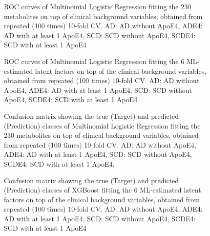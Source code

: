 \documentclass{amsart}
\begin{document}
\begin{figure}[h]
  
  \caption{\label{roc:full}ROC curves of Multinomial Logistic Regression fitting the 230 metabolites on top of clinical background variables, obtained from repeated (100 times) 10-fold CV. AD: AD without ApoE4, ADE4: AD with at least 1 ApoE4, SCD: SCD without ApoE4, SCDE4: SCD with at least 1 ApoE4}
  
\end{figure} \clearpage
\begin{figure}[ht]

\caption{\label{roc:6mlogit} ROC curves of Multinomial Logistic Regression fitting the 6 ML-estimated latent factors on top of the clinical background variables, obtained from repeated (100 times) 10-fold CV. AD: AD without ApoE4, ADE4: AD with at least 1 ApoE4, SCD: SCD without ApoE4, SCDE4: SCD with at least 1 ApoE4}
\end{figure} 
\begin{figure}[h]
  
  \caption{Confusion matrix showing the true (Target) and predicted (Prediction) classes of Multinomial Logistic Regression fitting the 230 metabolites on top of clinical background variables, obtained from repeated (100 times) 10-fold CV. AD: AD without ApoE4, ADE4: AD with at least 1 ApoE4, SCD: SCD without ApoE4, SCDE4: SCD with at least 1 ApoE4.}
  \label{cm:full}
\end{figure}
\begin{figure}[ht]
    
    \caption{Confusion matrix showing the true (Target) and predicted (Prediction) classes of XGBoost fitting the 6 ML-estimated latent factors on top of the clinical background variables, obtained from repeated (100 times) 10-fold CV. AD: AD without ApoE4, ADE4: AD with at least 1 ApoE4, SCD: SCD without ApoE4, SCDE4: SCD with at least 1 ApoE4}
  \label{cm:xgboost}
\end{figure}
\end{document}
